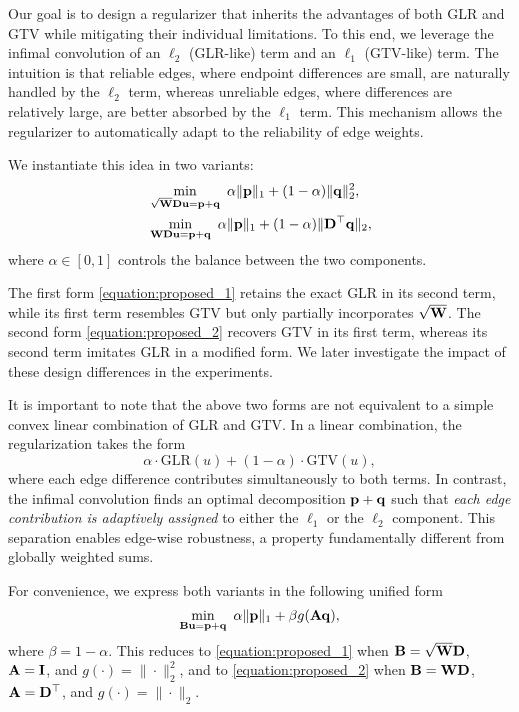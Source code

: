 Our goal is to design a regularizer that inherits the advantages of both GLR and GTV while mitigating their individual limitations. 
To this end, we leverage the infimal convolution of an $\ell_{2}$ (GLR-like) term and an $\ell_{1}$ (GTV-like) term. 
The intuition is that reliable edges, where endpoint differences are small, are naturally handled by the $\ell_{2}$ term, whereas unreliable edges, where differences are relatively large, are better absorbed by the $\ell_{1}$ term. 
This mechanism allows the regularizer to automatically adapt to the reliability of edge weights.

We instantiate this idea in two variants:
\begin{align}
    \label{equation:proposed_1}
    &\min_{\sqrt{\mathbf{W}} \mathbf{D} \mathbf{u} = \mathbf{p} + \mathbf{q}} \ \alpha \|\mathbf{p}\|_{1} + (1 - \alpha)\|\mathbf{q}\|_{2}^{2}, \\
    \label{equation:proposed_2}
    &\min_{\mathbf{W} \mathbf{D} \mathbf{u} = \mathbf{p} + \mathbf{q}} \ \alpha \|\mathbf{p}\|_{1} + (1 - \alpha)\|\mathbf{D}^\top \mathbf{q}\|_{2},
\end{align}
where $\alpha \in [0, 1]$ controls the balance between the two components.  

The first form \eqref{equation:proposed_1} retains the exact GLR in its second term, while its first term resembles GTV but only partially incorporates $\sqrt{\mathbf{W}}$. 
The second form \eqref{equation:proposed_2} recovers GTV in its first term, whereas its second term imitates GLR in a modified form. 
We later investigate the impact of these design differences in the experiments.

It is important to note that the above two forms are not equivalent to a
simple convex linear combination of GLR and GTV. In a linear combination, the regularization takes the form
\[
\alpha \cdot \text{GLR}(u) + (1-\alpha)\cdot \text{GTV}(u),
\]
where each edge difference contributes simultaneously to both terms. In contrast, the infimal convolution  finds an
optimal decomposition $\mathbf{p} + \mathbf{q}$ such that \emph{each edge contribution
is adaptively assigned} to either the $\ell_1$ or the $\ell_{2}$ component.
This separation enables edge-wise robustness, a property fundamentally
different from globally weighted sums.

For convenience, we express both variants in the following unified form
\begin{equation}
    \label{equation:unified_regularization}
    \min_{\mathbf{B} \mathbf{u} = \mathbf{p} + \mathbf{q}} \ \alpha \|\mathbf{p}\|_{1} + \beta g(\mathbf{A} \mathbf{q}),
\end{equation}
where $\beta = 1 - \alpha$. 
This reduces to \eqref{equation:proposed_1} when $\mathbf{B} = \sqrt{\mathbf{W}}\mathbf{D}$, $\mathbf{A} = \mathbf{I}$, and $g(\cdot) = \|\cdot\|_{2}^{2}$, and to \eqref{equation:proposed_2} when $\mathbf{B} = \mathbf{W} \mathbf{D}$, $\mathbf{A} = \mathbf{D}^\top$, and $g(\cdot) = \|\cdot\|_{2}$.